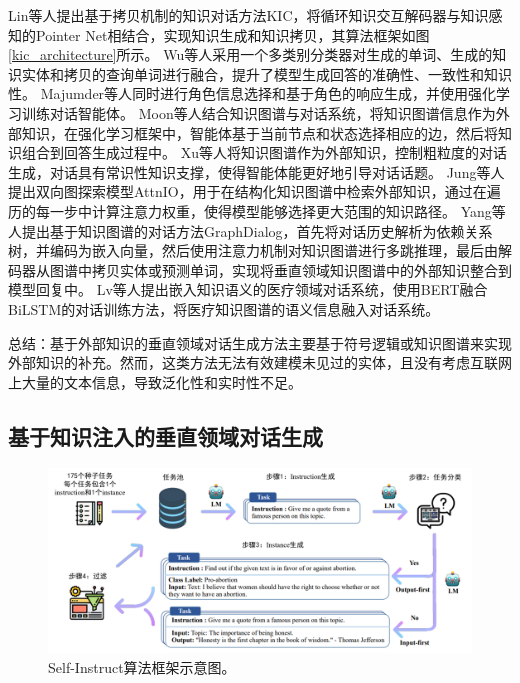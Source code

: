 Lin等人\cite{DBLP:conf/acl/LinJHWC20}提出基于拷贝机制的知识对话方法KIC，将循环知识交互解码器与知识感知的Pointer Net相结合，实现知识生成和知识拷贝，其算法框架如图\ref{kic_architecture}所示。
Wu等人\cite{DBLP:conf/acl/WuLZZW20}采用一个多类别分类器对生成的单词、生成的知识实体和拷贝的查询单词进行融合，提升了模型生成回答的准确性、一致性和知识性。
Majumder等人\cite{DBLP:conf/emnlp/MajumderJBM20}同时进行角色信息选择和基于角色的响应生成，并使用强化学习训练对话智能体。
Moon等人\cite{DBLP:conf/acl/MoonSKS19}结合知识图谱与对话系统，将知识图谱信息作为外部知识，在强化学习框架中，智能体基于当前节点和状态选择相应的边，然后将知识组合到回答生成过程中。
Xu等人\cite{DBLP:conf/acl/XuWNWCL20}将知识图谱作为外部知识，控制粗粒度的对话生成，对话具有常识性知识支撑，使得智能体能更好地引导对话话题。
Jung等人\cite{DBLP:conf/emnlp/JungSL20}提出双向图探索模型AttnIO，用于在结构化知识图谱中检索外部知识，通过在遍历的每一步中计算注意力权重，使得模型能够选择更大范围的知识路径。
Yang等人\cite{DBLP:conf/emnlp/YangZE20}提出基于知识图谱的对话方法GraphDialog，首先将对话历史解析为依赖关系树，并编码为嵌入向量，然后使用注意力机制对知识图谱进行多跳推理，最后由解码器从图谱中拷贝实体或预测单词，实现将垂直领域知识图谱中的外部知识整合到模型回复中。
Lv等人\cite{SJSJ202312037}提出嵌入知识语义的医疗领域对话系统，使用BERT融合BiLSTM的对话训练方法，将医疗知识图谱的语义信息融入对话系统。

总结：基于外部知识的垂直领域对话生成方法主要基于符号逻辑或知识图谱来实现外部知识的补充。然而，这类方法无法有效建模未见过的实体，且没有考虑互联网上大量的文本信息，导致泛化性和实时性不足。

\subsection{基于知识注入的垂直领域对话生成}

\begin{figure}[htbp]
	\centering
	\includegraphics[scale=0.5]{Fig/self-instruct_architecture.png}
	\caption{\label{self_instruct_architecture}Self-Instruct算法框架示意图\cite{DBLP:conf/acl/WangKMLSKH23}。}
\end{figure}

